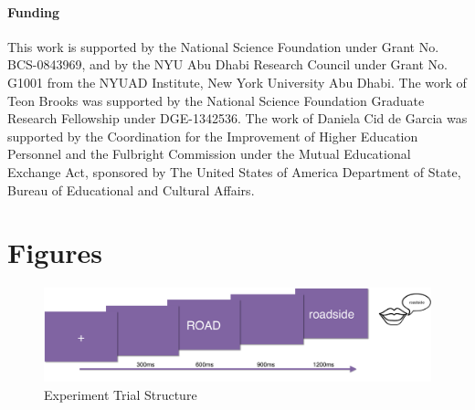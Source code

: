 \documentclass{frontiersSCNS}
\begin{document}
\paragraph{Funding\textcolon} 		 	 	 		
					
This work is supported by the National Science Foundation under Grant No. BCS-0843969, and by the NYU Abu Dhabi Research Council under Grant No. G1001 from the NYUAD Institute, New York University Abu Dhabi.  The work of Teon Brooks was supported by the National Science Foundation Graduate Research Fellowship under DGE-1342536. The work of Daniela Cid de Garcia was supported by the Coordination for the Improvement of Higher Education Personnel and the Fulbright Commission under the Mutual Educational Exchange Act, sponsored by The United States of
America Department of State, Bureau of Educational and Cultural Affairs.



\section*{Figures}

\begin{figure}
\begin{centering}
\includegraphics[scale=0.4]{images/task}
\par\end{centering}
\caption{\label{fig:task} Experiment Trial Structure}
\end{figure}
\end{document}
